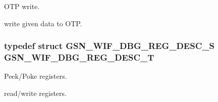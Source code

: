 OTP write. 

write given data to OTP. \hypertarget{a00637_ga50b90f67a85a905f110ae0541038a9df}{
\subsubsection[{GSN\_\-WIF\_\-DBG\_\-REG\_\-DESC\_\-T}]{\setlength{\rightskip}{0pt plus 5cm}typedef struct {\bf GSN\_\-WIF\_\-DBG\_\-REG\_\-DESC\_\-S}  {\bf GSN\_\-WIF\_\-DBG\_\-REG\_\-DESC\_\-T}}}
\label{a00637_ga50b90f67a85a905f110ae0541038a9df}


Peek/Poke registers. 

read/write registers. 